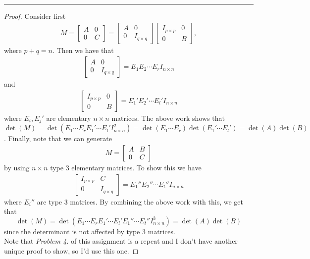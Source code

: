 \documentclass[leqno]{article}
\theoremstyle{nonumberplain}
\newtheorem{proof}{Proof}
\begin{document}
\noindent\rule[0.5ex]{\linewidth}{1pt}

\begin{proof}
Consider first 
\begin{align*}
M=\begin{bmatrix}
A  & 0\\
0 & C
\end{bmatrix}
=
\begin{bmatrix}
A & 0\\
0 & I_{q\times q}
\end{bmatrix}
\begin{bmatrix}
I_{p\times p} & 0\\
0 & B
\end{bmatrix},
\end{align*}
where $p+q=n$.  Then we have that
\begin{align*}
\begin{bmatrix}
A & 0\\
0 & I_{q\times q}
\end{bmatrix}=
E_1 E_2 \cdots E_r I_{n\times n}
\end{align*}
and
\begin{align*}
\begin{bmatrix}
I_{p\times p} & 0\\
0 & B
\end{bmatrix}=
E_1' E_2' \cdots E_l' I_{n\times n}
\end{align*}
where $E_i, E_j'$ are elementary $n\times n$ matrices.  The above work shows that $\det(M)=\det(E_1\cdots E_r E_1' \cdots E_l' I_{n\times n}^2)=\det(E_1\cdots E_r) \det(E_1' \cdots E_l')=\det(A)\det(B)$.  Finally, note that we can generate 
\begin{align*}
M=\begin{bmatrix}
A & B\\
0 & C
\end{bmatrix}
\end{align*}
by using $n\times n$ type 3 elementary matrices. To show this we have
\begin{align*}
\begin{bmatrix}
I_{p\times p} & C\\
0 & I_{q \times q}
\end{bmatrix}=
E_1'' E_2'' \cdots E_t'' I_{n\times n}
\end{align*}
where $E_i''$ are type 3 matrices.  By combining the above work with this, we get that 
\[\det(M)=\det(E_1\cdots E_r E_1' \cdots E_l'E_1'' \cdots E_t'' I_{n\times n}^3)=\det(A)\det(B)
\] 
since the determinant is not affected by type 3 matrices.\\

\noindent Note that \emph{Problem 4.} of this assignment is a repeat and I don't have another unique proof to show, so I'd use this one.
\end{proof}
\end{document}
